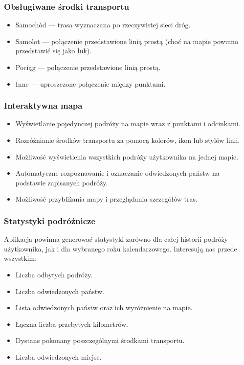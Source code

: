 \documentclass[a4paper,12pt]{article}
\begin{document}
\subsubsection*{Obsługiwane środki transportu}

\begin{itemize}
  \item Samochód --- trasa wyznaczana po rzeczywistej sieci dróg.
  \item Samolot --- połączenie przedstawione linią prostą (choć na mapie powinno przedstawić się
        jako łuk).
  \item Pociąg --- połączenie przedstawione linią prostą.
  \item Inne --- uproszczone połączenie między punktami.
\end{itemize}

\subsubsection*{Interaktywna mapa}

\begin{itemize}
  \item Wyświetlanie pojedynczej podróży na mapie wraz z punktami i odcinkami.
  \item Rozróżnianie środków transportu za pomocą kolorów, ikon lub stylów linii.
  \item Możliwość wyświetlenia wszystkich podróży użytkownika na jednej mapie.
  \item Automatyczne rozpoznawanie i oznaczanie odwiedzonych państw na podstawie zapisanych
        podróży.
  \item Możliwość przybliżania mapy i przeglądania szczegółów tras.
\end{itemize}

\subsubsection*{Statystyki podróżnicze}

Aplikacja powinna generować statystyki zarówno dla całej historii podróży użytkownika, jak i dla
wybranego roku kalendarzowego. Interesują nas przede wszystkim:

\begin{itemize}
  \item Liczba odbytych podróży.
  \item Liczba odwiedzonych państw.
  \item Lista odwiedzonych państw oraz ich wyróżnienie na mapie.
  \item Łączna liczba przebytych kilometrów.
  \item Dystans pokonany poszczególnymi środkami transportu.
  \item Liczba odwiedzonych miejsc.
\end{itemize}
\end{document}
